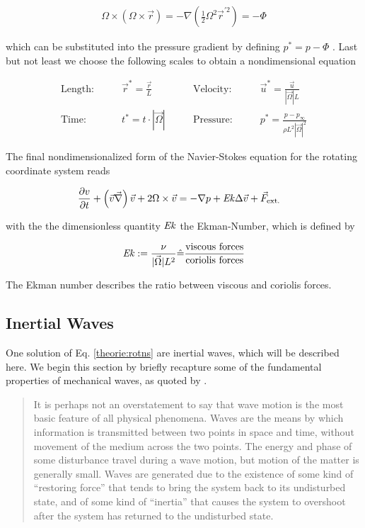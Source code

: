 \begin{align}
    \Omega \times (\Omega \times \vec{r}) = - \nabla \left(\frac{1}{2}\Omega^2\vec{r}^{'2}\right) = -\Phi
\end{align}

which can be substituted into the pressure gradient by defining $p^* = p - \Phi$ \citep{tritton88}.
\newpage
Last but not least we choose the following scales to obtain a nondimensional equation

\begin{align}
    \text{Length:}\qquad &  \vec{r}^* = \frac{\vec{r}}{L}  &
    \qquad \text{Velocity:}\qquad& \vec{u}^* =  \frac{\vec{u}}{|\vec{\Omega}|L}\\
    \text{Time:}  \qquad & t^* = t \cdot |\vec{\Omega}| &
    \qquad  \text{Pressure:}\qquad & p^* = \frac{p - p_\infty}{\rho L^2{|\vec{\Omega}|}^2}
\end{align}

The final nondimensionalized form of the Navier-Stokes equation for the rotating coordinate system reads

\begin{align}
    \label{theorie:rotns}
    \pdn[v]{t}+ \left(\vec{v}  \vec{\nabla}\right) \vec{v} + 2\Omega \times \vec{v}  &= -  \nabla p + \Ekman \Delta \vec{v} + \vec{F}_{\text{ext.}}
\end{align}

with the the dimensionless quantity $\mbox{\textit{Ek}}$ the Ekman-Number, which is defined by

\begin{align}
    \mbox{\textit{Ek}} := \frac{\nu}{|\vec{\Omega}| L^2} \hat{=} \frac{\text{viscous forces}}{\text{coriolis forces}}
\end{align}

The Ekman number describes the ratio between viscous and coriolis forces.

\subsection{Inertial Waves}

One solution of Eq. \ref{theorie:rotns} are inertial waves, which will be described here.
We begin this section by briefly recapture some of the fundamental properties of mechanical waves, as quoted by \cite[p.194]{Kundu2012}.

\begin{quote}
It is perhaps not an overstatement to say that wave motion is the most basic feature
of all physical phenomena. Waves are the means by which information is transmitted
between two points in space and time, without movement of the medium across the
two points. The energy and phase of some disturbance travel during a wave motion,
but motion of the matter is generally small. Waves are generated due to the existence of
some kind of “restoring force” that tends to bring the system back to its undisturbed
state, and of some kind of “inertia” that causes the system to overshoot after the
system has returned to the undisturbed state.
\end{quote}

